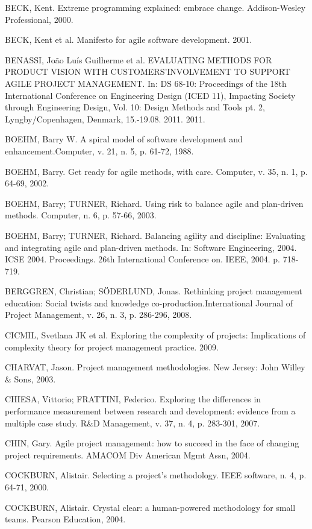 BECK, Kent. Extreme programming explained: embrace change. Addison-Wesley Professional, 2000.

BECK, Kent et al. Manifesto for agile software development. 2001.

BENASSI, João Luís Guilherme et al. EVALUATING METHODS FOR PRODUCT VISION WITH CUSTOMERS’INVOLVEMENT TO SUPPORT AGILE PROJECT MANAGEMENT. In: DS 68-10: Proceedings of the 18th International Conference on Engineering Design (ICED 11), Impacting Society through Engineering Design, Vol. 10: Design Methods and Tools pt. 2, Lyngby/Copenhagen, Denmark, 15.-19.08. 2011. 2011.

BOEHM, Barry W. A spiral model of software development and enhancement.Computer, v. 21, n. 5, p. 61-72, 1988.

BOEHM, Barry. Get ready for agile methods, with care. Computer, v. 35, n. 1, p. 64-69, 2002.

BOEHM, Barry; TURNER, Richard. Using risk to balance agile and plan-driven methods. Computer, n. 6, p. 57-66, 2003.

BOEHM, Barry; TURNER, Richard. Balancing agility and discipline: Evaluating and integrating agile and plan-driven methods. In: Software Engineering, 2004. ICSE 2004. Proceedings. 26th International Conference on. IEEE, 2004. p. 718-719.

BERGGREN, Christian; SÖDERLUND, Jonas. Rethinking project management education: Social twists and knowledge co-production.International Journal of Project Management, v. 26, n. 3, p. 286-296, 2008.

CICMIL, Svetlana JK et al. Exploring the complexity of projects: Implications of complexity theory for project management practice. 2009.

CHARVAT, Jason. Project management methodologies. New Jersey: John Willey \& Sons, 2003.

CHIESA, Vittorio; FRATTINI, Federico. Exploring the differences in performance measurement between research and development: evidence from a multiple case study. R\&D Management, v. 37, n. 4, p. 283-301, 2007.

CHIN, Gary. Agile project management: how to succeed in the face of changing project requirements. AMACOM Div American Mgmt Assn, 2004.

COCKBURN, Alistair. Selecting a project's methodology. IEEE software, n. 4, p. 64-71, 2000.

COCKBURN, Alistair. Crystal clear: a human-powered methodology for small teams. Pearson Education, 2004.


